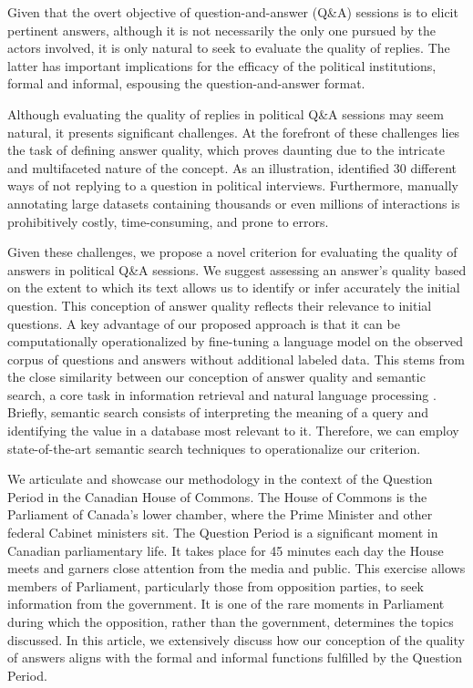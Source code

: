 {{Given that the overt objective of question-and-answer (Q\&A) sessions is to elicit pertinent answers, although it is not necessarily the only one pursued by the actors involved, it is only natural to seek to evaluate the quality of replies. The latter has important implications for the efficacy of the political institutions, formal and informal, espousing the question-and-answer format.

Although evaluating the quality of replies in political Q\&A sessions may seem natural, it presents significant challenges. At the forefront of these challenges lies the task of defining answer quality, which proves daunting due to the intricate and multifaceted nature of the concept. As an illustration, \citet{bull_mayer_1993} identified 30 different ways of not replying to a question in political interviews. Furthermore, manually annotating large datasets containing thousands or even millions of interactions is prohibitively costly, time-consuming, and prone to errors.

Given these challenges, we propose a novel criterion for evaluating the quality of answers in political Q\&A sessions. We suggest assessing an answer's quality based on the extent to which its text allows us to identify or infer accurately the initial question. This conception of answer quality reflects their relevance to initial questions. A key advantage of our proposed approach is that it can be computationally operationalized by fine-tuning a language model on the observed corpus of questions and answers without additional labeled data. This stems from the close similarity between our conception of answer quality and semantic search, a core task in information retrieval and natural language processing \citep{INR-032}. Briefly, semantic search consists of interpreting the meaning of a query and identifying the value in a database most relevant to it. Therefore, we can employ state-of-the-art semantic search techniques to operationalize our criterion.

We articulate and showcase our methodology in the context of the Question Period in the Canadian House of Commons. The House of Commons is the Parliament of Canada’s lower chamber, where the Prime Minister and other federal Cabinet ministers sit. The Question Period is a significant moment in Canadian parliamentary life. It takes place for 45 minutes each day the House meets and garners close attention from the media and public. This exercise allows members of Parliament, particularly those from opposition parties, to seek information from the government. It is one of the rare moments in Parliament during which the opposition, rather than the government, determines the topics discussed. In this article, we extensively discuss how our conception of the quality of answers aligns with the formal and informal functions fulfilled by the Question Period.

}}
